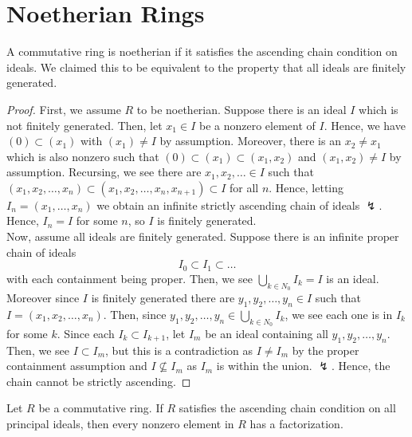 \section{Noetherian Rings}
\begin{recall}
A commutative ring is noetherian if it satisfies the ascending chain condition on ideals. We claimed this to be equivalent to the property that all ideals are finitely generated.
\end{recall}
\begin{proof}
	First, we assume \(R\) to be noetherian. Suppose there is an ideal \(I\) which is not finitely generated. Then, let \(x_1 \in I\) be a nonzero element of \(I\). Hence, we have \(\left( 0 \right) \subset \left( x_1 \right) \) with \(\left( x_1 \right) \neq I \) by assumption. Moreover, there is an \(x_2 \neq x_1\) which is also nonzero such that \(\left( 0 \right) \subset \left( x_1 \right) \subset \left( x_1, x_2 \right) \) and \(\left( x_1, x_2 \right) \neq I\) by assumption. Recursing, we see there are \(x_1, x_2, \ldots \in I\) such that \(\left( x_1, x_2, \ldots, x_{n} \right) \subset \left( x_1, x_2, \ldots, x_{n}, x_{n+1} \right) \subset I\) for all \(n\). Hence, letting \(I_{n} = \left( x_1, \ldots, x_{n} \right) \) we obtain an infinite strictly ascending chain of ideals \(\lightning\). Hence,  \(I_{n} = I\) for some \(n\), so \(I\) is finitely generated.\\
Now, assume all ideals are finitely generated. Suppose there is an infinite proper chain of ideals \[
I_0 \subset I_1 \subset \ldots
\] with each containment being proper. Then, we see \(\bigcup_{k \in N_0} I_{k} = I \)  is an ideal. Moreover since \(I\) is finitely generated there are \(y_1, y_2, \ldots, y_{n} \in I\) such that \(I = \left( x_1, x_2, \ldots, x_{n} \right) \). Then, since \(y_1, y_2, \ldots, y_{n} \in \bigcup_{k \in N_0}I_{k} \), we see each one is in \(I_{k}\) for some \(k\). Since each \(I_{k} \subset I_{k+1}\), let \(I_{m}\) be an ideal containing all \(y_1, y_2, \ldots, y_{n}\). Then, we see \(I \subset I_{m}\), but this is a contradiction as \(I \neq I_{m}\) by the proper containment assumption and \(I \nsubseteq I_{m}\) as \(I_{m}\) is within the union. \(\lightning\). Hence, the chain cannot be strictly ascending.
\end{proof}
\begin{proposition}
	Let \(R\) be a commutative ring. If \(R\) satisfies the ascending chain condition on all principal ideals, then every nonzero element in \(R\) has a factorization.
\end{proposition}
